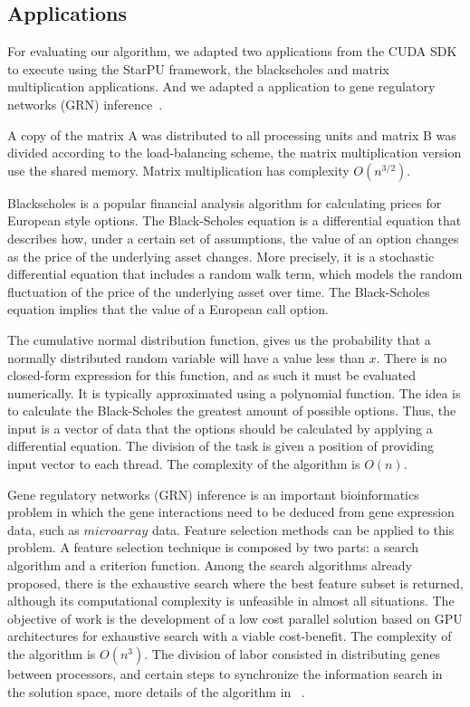 \documentclass[journal]{IEEEtran}
\begin{document}
\subsection{Applications}

For evaluating our algorithm, we adapted two applications from the CUDA
SDK~\cite{cuda} to execute using the StarPU framework, the blackscholes and matrix
multiplication applications. And we adapted a application to gene regulatory networks (GRN) inference~\cite{borelli2013gene}.

 A copy of the matrix A was distributed to all processing units and matrix B was divided according to
the load-balancing scheme, the matrix multiplication version use the shared memory. Matrix multiplication has complexity $O(n^{3/2})$.

Blackscholes is a popular financial analysis algorithm for calculating prices
for European style options. The Black-Scholes equation is a differential
equation that describes how, under a certain set of assumptions, the value of an
option changes as the price of the underlying asset changes. More precisely, it
is a stochastic differential equation that includes a random walk term, which
models the random fluctuation of the price of the underlying asset over time.
The Black-Scholes equation implies that the value of a European call option.


The cumulative normal distribution function, gives us the probability that a
normally distributed random variable will have a value less than $x$. There is no
closed-form expression for this function, and as such it must be evaluated
numerically. It is typically approximated using a polynomial function. The idea is to calculate the Black-Scholes the greatest amount of possible options. Thus, the input is a vector of data that the options should be calculated by applying a differential equation. The division of the task is given a position of providing input vector to each thread. The complexity of the algorithm is $O(n)$.


Gene regulatory networks (GRN) inference is an important bioinformatics problem in which the gene interactions need to be deduced from gene expression data, such as $microarray$ data. Feature selection methods can be applied to this problem. A feature selection technique is composed by two parts: a search algorithm and a criterion function. Among the search algorithms already proposed, there is the exhaustive search where the best
feature subset is returned, although its computational complexity is unfeasible in almost all situations. The objective of work is the development of a low cost parallel solution based on GPU architectures for exhaustive search with a viable cost-benefit. The complexity of the algorithm is $O(n^3)$. The division of labor consisted in distributing genes between processors, and certain steps to synchronize the information search in the solution space, more details of the algorithm in ~\cite{borelli2013gene}.
\end{document}
